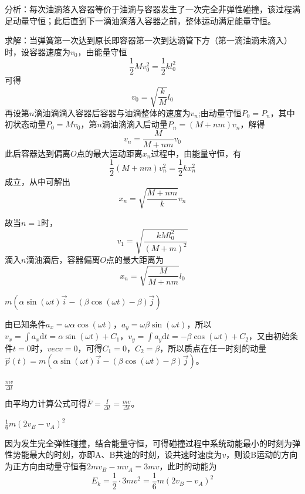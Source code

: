 \documentclass[b5paper,opensource,sourcefont,parskip]{qyxf-book}
\newcommand{\di}[1]{\mathrm{d}#1}
\begin{document}
分析：每次油滴落入容器等价于油滴与容器发生了一次完全非弹性碰撞，该过程满足动量守恒；此后直到下一滴油滴落入容器之前，整体运动满足能量守恒。

求解：当弹簧第一次达到原长即容器第一次到达滴管下方（第一滴油滴未滴入）时，设容器速度为$v_0$，由能量守恒
\begin{equation*}
\frac{1}{2}Mv_0^2=\frac{1}{2}kl_0^2
\end{equation*}
可得
\begin{equation*}
v_0=\sqrt{\frac{k}{M}}l_0
\end{equation*}
再设第$n$滴油滴滴入容器后容器与油滴整体的速度为$v_n$;由动量守恒$P_0=P_n$，其中初状态动量$P_0=Mv_0$，第$n$滴油滴滴入后动量$P_n=(M+nm)v_n$，解得
\begin{equation*}
v_n=\frac{M}{M+nm}v_0
\end{equation*}
此后容器达到偏离$O$点的最大运动距离$x_n$过程中，由能量守恒，有
\begin{equation*}
\frac{1}{2}(M+nm)v_n^2=\frac{1}{2}kx_n^2
\end{equation*}
成立，从中可解出
\begin{equation*}
x_n=\sqrt{\frac{M+nm}{k}}v_n
\end{equation*}

故当$n=1$时，
\begin{equation*}
v_1=\sqrt{\frac{kMl_0^2}{(M+m)^2}}
\end{equation*}
滴入$n$滴油滴后，容器偏离$O$点的最大距离为
\begin{equation*}
x_n=\sqrt{\frac{M}{M+nm}}l_0
\end{equation*}

$m(\alpha\sin(\omega t)\vec{i}-(\beta\cos(\omega t)-\beta)\vec{j})$

由已知条件$a_x=\omega\alpha\cos(\omega t)，a_y=\omega\beta\sin(\omega t)$，所以$v_x=\int a_x\di t=\alpha\sin(\omega t)+C_1，v_y=\int a_y\di t=-\beta\cos(\omega t)+C_2$，又由初始条件$t=0$时，$vec{v}=0$，可得$C_1=0，C_2=\beta$，所以质点在任一时刻的动量$\vec{p}(t)=m(\alpha\sin(\omega t)\vec{i}-(\beta\cos(\omega t)-\beta)\vec{j})$。
			
$\frac{mv}{\Delta t}$
			
由平均力计算公式可得$\overline{F}=\frac{I}{\Delta t}=\frac{mv}{\Delta t}$。

$\frac{1}{6}m(2v_B-v_A)^2$
			
因为发生完全弹性碰撞，结合能量守恒，可得碰撞过程中系统动能最小的时刻为弹性势能最大的时刻，亦即A、B共速的时刻，设共速时速度为$v$，则设B运动的方向为正方向由动量守恒有$2mv_B-mv_A=3mv$，此时的动能为
\begin{equation*}
E_k=\frac{1}{2}\cdot 3mv^2=\frac{1}{6}m(2v_B-v_A)^2
\end{equation*}
\end{document}
